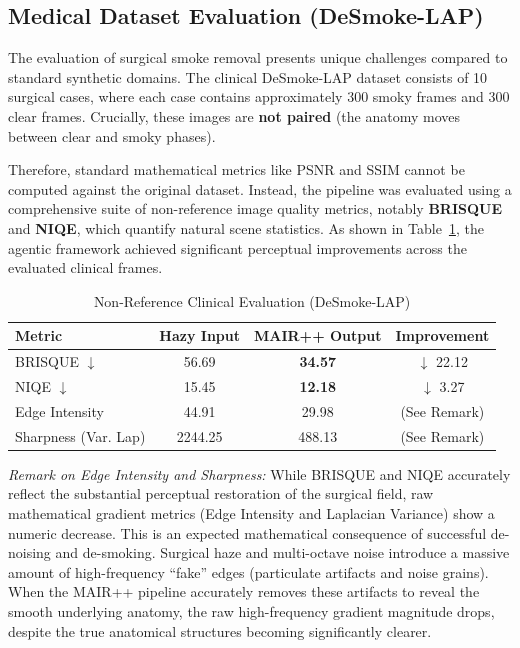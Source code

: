 \documentclass[journal, 10pt]{IEEEtran}
\begin{document}
\subsection{Medical Dataset Evaluation (DeSmoke-LAP)}
The evaluation of surgical smoke removal presents unique challenges compared to standard synthetic domains. The clinical DeSmoke-LAP dataset consists of 10 surgical cases, where each case contains approximately 300 smoky frames and 300 clear frames. Crucially, these images are \textbf{not paired} (the anatomy moves between clear and smoky phases). 

Therefore, standard mathematical metrics like PSNR and SSIM cannot be computed against the original dataset. Instead, the pipeline was evaluated using a comprehensive suite of non-reference image quality metrics, notably \textbf{BRISQUE} and \textbf{NIQE}, which quantify natural scene statistics. As shown in Table~\ref{tab:clinical_metrics}, the agentic framework achieved significant perceptual improvements across the evaluated clinical frames.

\begin{table}[h]
\caption{Non-Reference Clinical Evaluation (DeSmoke-LAP)}
\label{tab:clinical_metrics}
\centering
\begin{tabular}{lccc}
\toprule
\textbf{Metric} & \textbf{Hazy Input} & \textbf{MAIR++ Output} & \textbf{Improvement} \\
\midrule
BRISQUE $\downarrow$ & 56.69 & \textbf{34.57} & $\downarrow$ 22.12 \\
NIQE $\downarrow$ & 15.45 & \textbf{12.18} & $\downarrow$ 3.27 \\
Edge Intensity & 44.91 & 29.98 & (See Remark) \\
Sharpness (Var. Lap) & 2244.25 & 488.13 & (See Remark) \\
\bottomrule
\end{tabular}
\end{table}

\noindent\textit{Remark on Edge Intensity and Sharpness:} While BRISQUE and NIQE accurately reflect the substantial perceptual restoration of the surgical field, raw mathematical gradient metrics (Edge Intensity and Laplacian Variance) show a numeric decrease. This is an expected mathematical consequence of successful de-noising and de-smoking. Surgical haze and multi-octave noise introduce a massive amount of high-frequency ``fake'' edges (particulate artifacts and noise grains). When the MAIR++ pipeline accurately removes these artifacts to reveal the smooth underlying anatomy, the raw high-frequency gradient magnitude drops, despite the true anatomical structures becoming significantly clearer.
\end{document}
